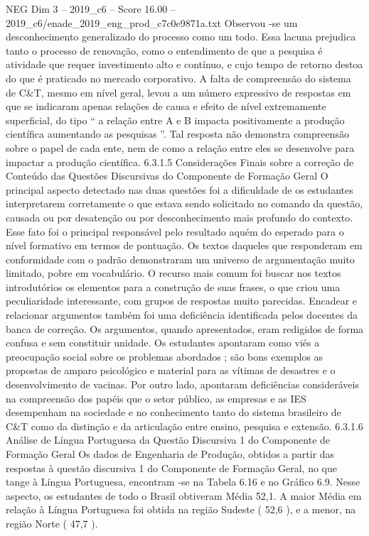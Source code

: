 \begin{textsample}{NEG Dim 3 – 2019\_c6 – Score 16.00 – 2019\_c6/enade\_2019\_eng\_prod\_c7c0e9871a.txt}
Observou -se um desconhecimento generalizado do processo como um todo.
Essa lacuna prejudica tanto o processo de renovação, como o entendimento de que a pesquisa é atividade que requer investimento alto e contínuo, e cujo tempo de retorno destoa do que é praticado no mercado corporativo.
A falta de compreensão do sistema de C\&T, mesmo em nível geral, levou a um número expressivo de respostas em que se indicaram apenas relações de causa e efeito de nível extremamente superficial, do tipo “ a relação entre A e B impacta positivamente a produção científica aumentando as pesquisas ”.
Tal resposta não demonstra compreensão sobre o papel de cada ente, nem de como a relação entre eles se desenvolve para impactar a produção científica. 6.3.1.5 Considerações Finais sobre a correção de Conteúdo das Questões Discursivas do Componente de Formação Geral O principal aspecto detectado nas duas questões foi a dificuldade de os estudantes interpretarem corretamente o que estava sendo solicitado no comando da questão, causada ou por desatenção ou por desconhecimento mais profundo do contexto.
Esse fato foi o principal responsável pelo resultado aquém do esperado para o nível formativo em termos de pontuação.
Os textos daqueles que responderam em conformidade com o padrão demonstraram um universo de argumentação muito limitado, pobre em vocabulário.
O recurso mais comum foi buscar nos textos introdutórios os elementos para a construção de suas frases, o que criou uma peculiaridade interessante, com grupos de respostas muito parecidas.
Encadear e relacionar argumentos também foi uma deficiência identificada pelos docentes da banca de correção.
Os argumentos, quando apresentados, eram redigidos de forma confusa e sem constituir unidade.
Os estudantes apontaram como viés a preocupação social sobre os problemas abordados ; são bons exemplos as propostas de amparo psicológico e material para as vítimas de desastres e o desenvolvimento de vacinas.
Por outro lado, apontaram deficiências consideráveis na compreensão dos papéis que o setor público, as empresas e as IES desempenham na sociedade e no conhecimento tanto do sistema brasileiro de C\&T como da distinção e da articulação entre ensino, pesquisa e extensão. 6.3.1.6 Análise de Língua Portuguesa da Questão Discursiva 1 do Componente de Formação Geral Os dados de Engenharia de Produção, obtidos a partir das respostas à questão discursiva 1 do Componente de Formação Geral, no que tange à Língua Portuguesa, encontram -se na Tabela 6.16 e no Gráfico 6.9.
Nesse aspecto, os estudantes de todo o Brasil obtiveram Média 52,1.
A maior Média em relação à Língua Portuguesa foi obtida na região Sudeste ( 52,6 ), e a menor, na região Norte ( 47,7 ).

\end{textsample}
